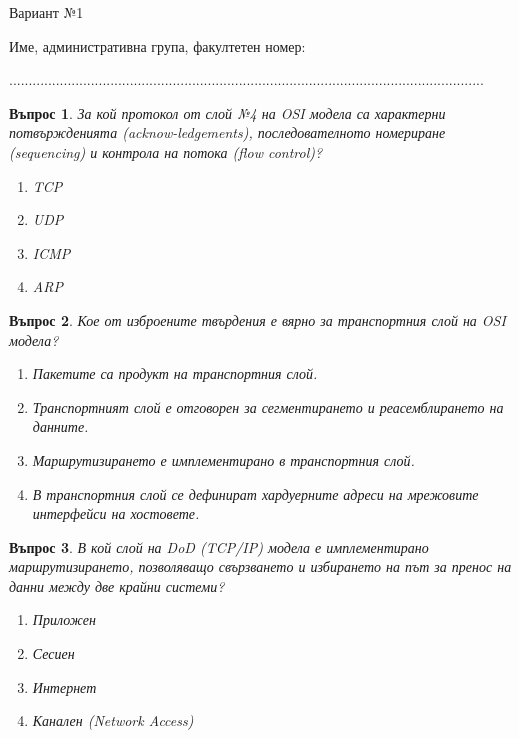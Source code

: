 \documentclass[11pt]{scrartcl}
\newtheorem{q}{Въпрос}
\newenvironment{defractors}{
\begin{enumerate}
  \setlength{\itemsep}{1pt}
  \setlength{\parskip}{0pt}
  \setlength{\parsep}{0pt}
}{\end{enumerate}}
\begin{document}
\title{}
\subtitle{\textrm{Вариант 1}}
\author{}
\date{}

\begin{center}
  Вариант №1
\end{center}

\begin{center}
Име, административна група, факултетен номер:

\end{center}

\begin{center}
..........................................................................................................................
\end{center}

\begin{q}
  За кой протокол от слой №4 на OSI модела са характерни потвържденията
  (acknow-ledgements), последователното номериране (sequencing) и контрола на
  потока (flow control)?

  \begin{defractors}
  \item TCP
  \item UDP
  \item ICMP
  \item ARP
  \end{defractors}
\end{q}

\begin{q}
  Кое от изброените твърдения е вярно за транспортния слой на OSI модела?

  \begin{defractors}
    \item Пакетите са продукт на транспортния слой.
    \item Транспортният слой е отговорен за сегментирането и реасемблирането на данните.
    \item Маршрутизирането е имплементирано в транспортния слой.
    \item В транспортния слой се дефинират хардуерните адреси на мрежовите интерфейси на хостовете.
  \end{defractors}
\end{q}

\begin{q}
  В кой слой на DoD (TCP/IP) модела е имплементирано маршрутизирането,
  позволяващо свързването и избирането на път за пренос на данни между две
  крайни системи?

  \begin{defractors}
  \item Приложен
  \item Сесиен
  \item Интернет
  \item Канален (Network Access)
  \end{defractors}
\end{q}
\end{document}
